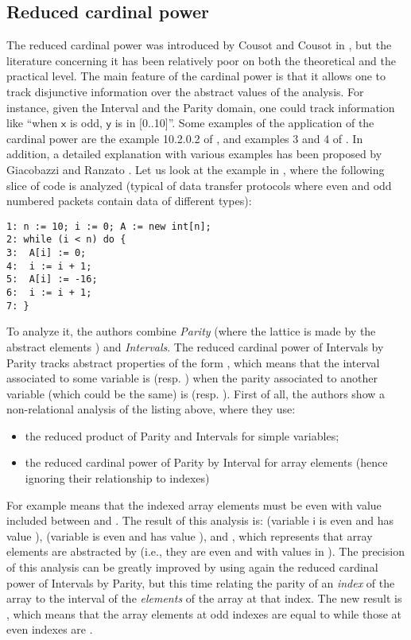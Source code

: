 \documentclass[submission,copyright,creativecommons]{eptcs}
\newcommand{\statement}[1]{\ensuremath{\mathsf{#1}}}
\begin{document}
\subsection{Reduced cardinal power}
The reduced cardinal power was introduced by Cousot and Cousot in \cite{CC79}, but the literature concerning it has been relatively poor on both the theoretical and the practical level. The main feature of the cardinal power is that it allows one to track disjunctive information over the abstract values of the analysis. For instance, given the Interval and the Parity domain, one could track information like \textquotedblleft when \statement{x} is odd, \statement{y} is in [0..10]\textquotedblright. Some examples of the application of the cardinal power are the example 10.2.0.2 of \cite{CC79}, and examples 3 and 4 of \cite{CCL11}. In addition, a detailed explanation with various examples has been proposed by Giacobazzi and Ranzato \cite{GR99}. Let us look at the example in \cite{CCL11}, where the following slice of
code is analyzed (typical of data transfer protocols where even and odd numbered packets contain data of different types):
\lstset{numbers=none}
\begin{lstlisting}
1: n := 10; i := 0; A := new int[n];
2: while (i < n) do {
3:  A[i] := 0;
4:  i := i + 1;
5:  A[i] := -16;
6:  i := i + 1;
7: }
\end{lstlisting}
To analyze it, the authors combine \textit{Parity} (where the lattice is made by the abstract elements ) and \textit{Intervals}. The reduced cardinal power of Intervals by Parity tracks abstract properties of the form , which means that the interval associated to some variable is  (resp. ) when the parity associated to another variable (which could be the same) is  (resp. ). First of all, the authors show a non-relational analysis of the listing above, where they use:
\begin{itemize}
\item the reduced product of Parity and Intervals for simple variables;
\item the reduced cardinal power of Parity by Interval for array elements (hence ignoring their relationship to indexes)
\end{itemize}
For example  means that the indexed array elements must be even with value included between  and . The result of this analysis is:  (variable \statement{i} is even and has value ),  (variable  is even and has value ), and , which represents that array elements are abstracted by  (i.e., they are even and with values in ). The precision of this analysis can be greatly improved by using again the reduced cardinal power of Intervals by Parity, but this time relating the parity of an \textit{index} of the array to the interval of the \textit{elements} of the array at that index. The new result is , which means that the array elements at odd indexes are equal to  while those at even indexes are .
\end{document}
